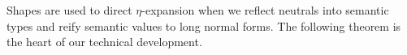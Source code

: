 \documentclass[acmlarge,review,anonymous]{acmart}\settopmatter{printfolios=true}
\begin{document}



Shapes are used to direct $\eta$-expansion when we reflect neutrals into semantic types and reify semantic values to long normal forms.  The following theorem is the heart of our technical development.
\end{document}
